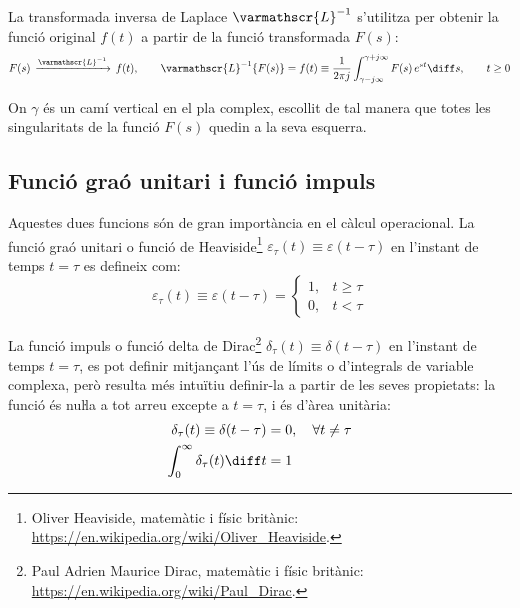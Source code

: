 La transformada inversa de Laplace $\varmathscr{L}^{-1}$ s'utilitza per
obtenir la funció original $f(t)$ a partir de la funció
transformada $F(s)$:
\begin{equation}
	F(s)\,\xrightarrow{\varmathscr{L}^{-1}}\,f(t), \qquad
    \varmathscr{L}^{-1}\{F(s)\} = f(t) \equiv \frac{1}{2 \pi j }
    \int_{\gamma-j \infty}^{\gamma+j \infty} F(s)\, e^{s t} \diff s,
    \qquad t\geq 0 \label{eq:transf_inv_laplace}
\end{equation}

On $\gamma$ és un camí vertical en el pla complex, escollit de tal
manera que totes les singularitats de la funció $F(s)$ quedin a la
seva esquerra.

\subsection{Funció graó unitari i funció impuls} 

Aquestes dues funcions són de gran importància en el càlcul
operacional. La funció graó unitari o funció de Heaviside\footnote{Oliver Heaviside, matemàtic i físic britànic: \href{https://en.wikipedia.org/wiki/Oliver_Heaviside}{https:/\!\!/en.wikipedia.org/wiki/Oliver\_Heaviside}.}
$\varepsilon_\tau(t) \equiv \varepsilon(t-\tau)$ en l'instant de temps
$t=\tau$ es defineix com:
\begin{equation}
    \varepsilon_\tau(t) \equiv \varepsilon(t-\tau) = \begin{cases} 1, & t \geq \tau \\ 0, & t < \tau \end{cases}
\end{equation}

La funció impuls o funció delta de Dirac\footnote{Paul Adrien Maurice Dirac, matemàtic i físic britànic: \href{https://en.wikipedia.org/wiki/Paul_Dirac}{https:/\!\!/en.wikipedia.org/wiki/Paul\_Dirac}.} $\delta_\tau(t) \equiv
\delta(t-\tau)$ en l'instant de temps $t=\tau$, es pot definir
mitjançant l'ús de límits o d'integrals de variable complexa, però
resulta més intuïtiu definir-la a partir de les seves propietats: la
funció és nuŀla a tot arreu excepte a $t=\tau$, i és d'àrea
unitària:
\begin{subequations}
\begin{align}
    \delta_\tau(t) \equiv \delta(t-\tau) &= 0, \quad \forall t \neq \tau \\
    \int_0^\infty \delta_\tau(t) \diff t &= 1
\end{align}
\end{subequations}

